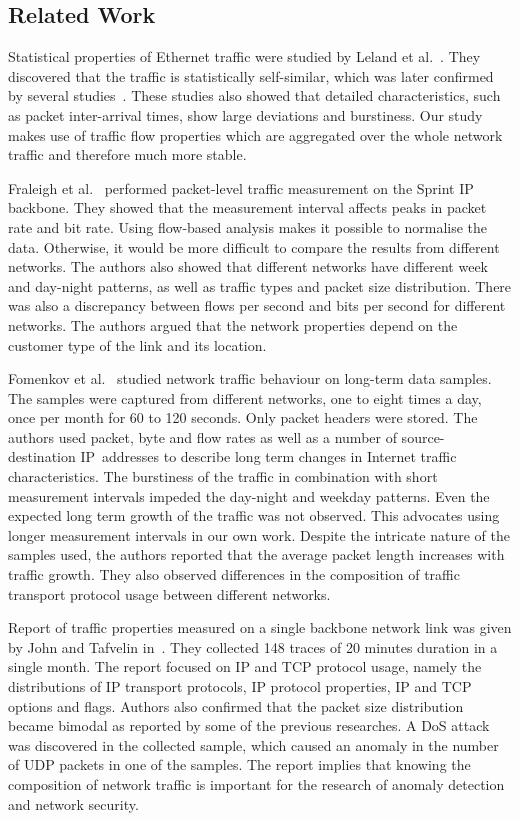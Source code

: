 \subsection{Related Work} \label{subsec:characterization-related_work}

Statistical properties of Ethernet traffic were studied by Leland et al.~\cite{Leland-1993-Self}. They discovered that the traffic is statistically self-similar, which was later confirmed by several studies~\cite{Crovella-1997-Self, Paxson-1995-Wide}. These studies also showed that detailed characteristics, such as packet inter-arrival times, show large deviations and burstiness. Our study makes use of traffic flow properties which are aggregated over the whole network traffic and therefore much more stable.

Fraleigh et al.~\cite{Fraleigh-2003-Packet} performed packet-level traffic measurement on the Sprint IP backbone. They showed that the measurement interval affects peaks in packet rate and bit rate. Using flow-based analysis makes it possible to normalise the data. Otherwise, it would be more difficult to compare the results from different networks. The authors also showed that different networks have different week and day-night patterns, as well as traffic types and packet size distribution. There was also a discrepancy between flows per second and bits per second for different networks. The authors argued that the network properties depend on the customer type of the link and its location.

Fomenkov et al.~\cite{Fomenkov-2004-Longitudinal} studied network traffic behaviour on long-term data samples. The samples were captured from different networks, one to eight times a day, once per month for 60 to 120 seconds. Only packet headers were stored. The authors used packet, byte and flow rates as well as a number of \mbox{source-destination} IP~addresses to describe long term changes in Internet traffic characteristics. The burstiness of the traffic in combination with short measurement intervals impeded the day-night and weekday patterns. Even the expected long term growth of the traffic was not observed. This advocates using longer measurement intervals in our own work. Despite the intricate nature of the samples used, the authors reported that the average packet length increases with traffic growth. They also observed differences in the composition of traffic transport protocol usage between different networks.

Report of traffic properties measured on a single backbone network link was given by John and Tafvelin in~\cite{John-2007-Analysis}. They collected 148 traces of 20 minutes duration in a single month. The report focused on IP and TCP protocol usage, namely the distributions of IP transport protocols, IP protocol properties, IP and TCP options and flags. Authors also confirmed that the packet size distribution became bimodal as reported by some of the previous researches. A DoS attack was discovered in the collected sample, which caused an anomaly in the number of UDP packets in one of the samples. The report implies that knowing the composition of network traffic is important for the research of anomaly detection and network security.

